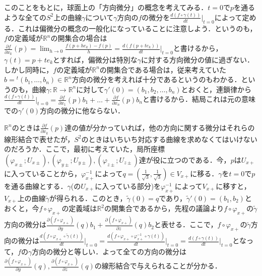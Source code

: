 \documentclass{jsarticle}
\def\realnum{{\mathbb R}}
\def\dfrac{\displaystyle\frac}
\def\tenchi{{}^t\!}
\def\delxkf{\dfrac{\partial f}{\partial x_k}}
\def\delxof{\dfrac{\partial f}{\partial x_1}}
\def\delxnf{\dfrac{\partial f}{\partial x_n}}
\begin{document}
このことをもとに，球面上の「方向微分」の概念を考えてみる．$t=0$で$p$を通るような全ての$S^2$上の曲線$\gamma$について$\gamma$方向の$f$の微分を$\dfrac{d(f\circ\gamma(t))}{dt}\Big|_{t=0}$によって定める．これは偏微分の概念の一般化になっていることに注意しよう．というのも，$f$の定義域が$\realnum^n$の開集合の場合は$\delxkf(p)=\lim_{h\rightarrow 0}\dfrac{f(p+he_k)-f(p)}{h}=\dfrac{d(f(p+te_k))}{dt}\Big|_{t=0}$と書けるから，$\gamma(t)=p+te_k$とすれば，偏微分は特別な$\gamma$に対する方向微分の値に過ぎない．しかし同時に，$f$の定義域が$\realnum^n$の開集合である場合は，従来考えていた$b=\tenchi(b_1,\dots,b_n)\in\realnum^n$方向の微分を考えれば十分であるというのもわかる．というのも，曲線$\gamma:\realnum\rightarrow \realnum^n$に対して$\gamma'(0)=(b_1,b_2,\dots,b_n)$とおくと，連鎖律から$\dfrac{d(f\circ\gamma(t))}{dt}\Big|_{t=0}=\delxof(p) b_1+\dots+\delxnf(p) b_n$と書けるから．結局これは元の意味での$\gamma'(0)$方向の微分に他ならない．


$\realnum^n$のときは$\delxkf(p)$達の値が分かっていれば，他の方向に関する微分はそれらの線形結合で表せたが，$S^2$のときはいちいち対応する曲線を求めなくてはいけないのだろうか．ここで，最初に考えていた，局所座標$(\varphi_{x\pm};U_{x\pm}),(\varphi_{y\pm};U_{y\pm}),(\varphi_{z\pm};U_{z\pm})$達が役に立つのである．今，$p$は$U_{x+}$に入っていることから，$\varphi_{x+}^{-1}$によって$q=(\frac{1}{\sqrt{3}},\frac{1}{\sqrt{3}})\in V_{x+}$に移る．$\gamma$を$t=0$で$p$を通る曲線とする．$\gamma$(の$U_{x+}$に入っている部分)を$\varphi_{x+}^{-1}$によって$V_{x+}$に移すと，$V_{x+}$上の曲線$\tilde{\gamma}$が得られる．このとき，$\tilde{\gamma}(0)=q$であり，$\tilde{\gamma}'(0)=(b_1,b_2)$とおくと，今$f\circ \varphi_{x+}$の定義域は$\realnum^2$の開集合であるから，先程の議論より$f\circ\varphi_{x+}$の$\tilde{\gamma}$方向の微分は$\dfrac{\partial (f\circ\varphi_{x+})}{\partial y}(q)b_1+\dfrac{\partial (f\circ\varphi_{x+})}{\partial z}(q)b_2$と表せる．ここで，$f\circ \varphi_{x+}$の$\tilde{\gamma}$方向の微分は$\dfrac{d(f\circ\varphi_{x+}\circ\tilde{\gamma}(t))}{dt}\Big|_{t=0}=\dfrac{d(f\circ\varphi_{x+}\circ\varphi_{x+}^{-1}\circ\gamma(t))}{dt}\Big|_{t=0}=\dfrac{d(f\circ\gamma(t))}{dt}\Big|_{t=0}$となって，$f$の$\gamma$方向の微分と等しい．よって全ての方向の微分は$\dfrac{\partial (f\circ\varphi_{x+})}{\partial y}(q),\dfrac{\partial (f\circ\varphi_{x+})}{\partial z}(q)$の線形結合で与えられることが分かる．
\end{document}
